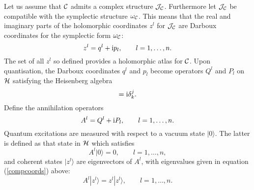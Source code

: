\documentclass[a4paper,a4paper]{article}
\begin{document}
Let us assume that ${\cal C}$ admits a complex structure ${\cal J}_{\cal C}$. 
Furthermore let ${\cal J}_{\cal C}$ be compatible with the symplectic structure 
$\omega_{\cal C}$. This means that the real and imaginary parts of the holomorphic 
coordinates $z^l$ for ${\cal J}_{\cal C}$ are Darboux coordinates for the symplectic form 
$\omega_{\cal C}$:
\begin{equation}
z^l=q^l + {\rm i} p_l,  \qquad l=1,\ldots, n.
\label{compcoords}
\end{equation}
The set of all $z^l$ so defined provides a holomorphic atlas for ${\cal C}$.
Upon quantisation, the Darboux coordinates
$q^l$ and $p_l$ become operators $Q^l$ and $P_l$ on ${\cal H}$ satisfying the Heisenberg algebra 
\begin{equation}
[Q^j, P_k]={\rm i}\delta^j_k.
\label{hei}
\end{equation}
Define the annihilation operators
\begin{equation}
A^l=Q^l+{\rm i} P_l,\qquad l=1,\ldots, n.
\label{anni}
\end{equation}
Quantum excitations are measured with respect to a vacuum state 
$|0\rangle$. The latter is defined as that state in ${\cal H}$ which
satisfies
\begin{equation}
A^l|0\rangle = 0,  \qquad l=1, \ldots, n,
\label{vac}
\end{equation}
and coherent states $|z^l\rangle$ are eigenvectors of $A^l$, 
with eigenvalues given in equation (\ref{compcoords}) above:
\begin{equation}
A^l|z^l\rangle=z^l|z^l\rangle,\qquad l=1,\ldots, n.
\label{annop}
\end{equation}
\end{document}
